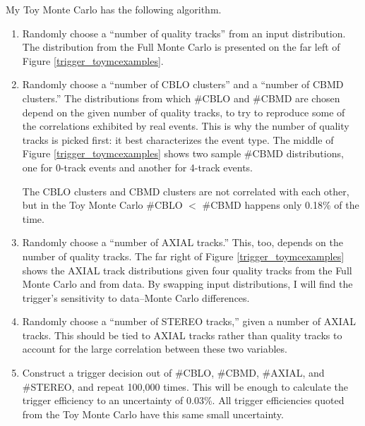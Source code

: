 My Toy Monte Carlo has the following algorithm.
\begin{enumerate}

  \item Randomly choose a ``number of quality tracks'' from an input
    distribution.  The distribution from the Full Monte Carlo is
    presented on the far left of Figure \ref{trigger_toymcexamples}.

  \item Randomly choose a ``number of CBLO clusters'' and a ``number
    of CBMD clusters.''  The distributions from which \#CBLO and
    \#CBMD are chosen depend on the given number of quality tracks, to
    try to reproduce some of the correlations exhibited by real
    events.  This is why the number of quality tracks is picked first:
    it best characterizes the event type.  The middle of Figure
    \ref{trigger_toymcexamples} shows two sample \#CBMD distributions,
    one for 0-track events and another for 4-track events.

    The CBLO clusters and CBMD clusters are not correlated with each
    other, but in the Toy Monte Carlo \#CBLO $<$ \#CBMD happens only
    0.18\% of the time.

  \item Randomly choose a ``number of AXIAL tracks.''  This, too,
    depends on the number of quality tracks.  The far right of Figure
    \ref{trigger_toymcexamples} shows the AXIAL track distributions
    given four quality tracks from the Full Monte Carlo and from data.
    By swapping input distributions, I will find the trigger's
    sensitivity to data--Monte Carlo differences.

  \item Randomly choose a ``number of STEREO tracks,'' given a number
    of AXIAL tracks.  This should be tied to AXIAL tracks rather than
    quality tracks to account for the large correlation between these
    two variables.

  \item Construct a trigger decision out of \#CBLO, \#CBMD, \#AXIAL,
    and \#STEREO, and repeat 100,000 times.  This will be
    enough to calculate the trigger efficiency to an uncertainty of
    0.03\%.  All trigger efficiencies quoted from the Toy Monte Carlo
    have this same small uncertainty.

\end{enumerate}

